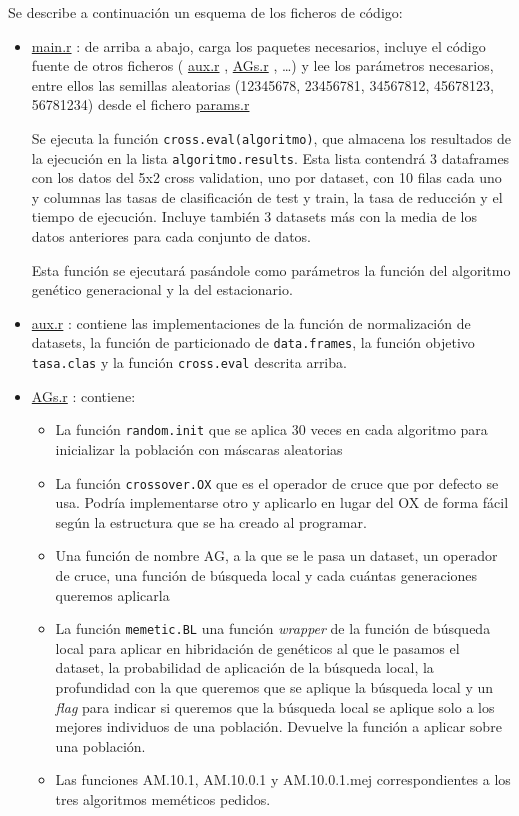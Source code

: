 \documentclass[a4paper,11pt]{article}
\newcommand{\hrefr}[1]{
\href{../bin/#1}{#1}
}
\begin{document}
Se describe a continuación un esquema de los ficheros de código:
\begin{itemize}
 \item \hrefr{main.r}: de arriba a abajo, carga los paquetes necesarios, incluye el código fuente de otros ficheros
  (\hrefr{aux.r}, \hrefr{AGs.r}, \ldots) y lee los parámetros necesarios, entre ellos las 
  semillas aleatorias (12345678, 23456781, 34567812, 45678123, 56781234) desde el fichero \hrefr{params.r}
  
  Se ejecuta la función \texttt{cross.eval(algoritmo)}, que almacena los resultados de la ejecución en la lista
  \texttt{algoritmo.results}. Esta lista contendrá 3 dataframes con los datos del 5x2 cross validation, uno por dataset, 
  con 10 filas cada uno  y columnas las tasas de clasificación de test y train, la tasa de reducción y el tiempo de 
  ejecución. Incluye también 3 datasets más con la media de los datos anteriores para cada conjunto de datos.
 
  Esta función se ejecutará pasándole como parámetros la función del algoritmo genético generacional y la del estacionario.
  
 \item \hrefr{aux.r}: contiene las implementaciones de la función de normalización de datasets, la función de
 particionado de \texttt{data.frames}, la función objetivo \texttt{tasa.clas} y la función \texttt{cross.eval}
 descrita arriba.
 
 \item \hrefr{AGs.r}: contiene:
  \begin{itemize}
   \item La función \texttt{random.init} que se aplica 30 veces en cada algoritmo para inicializar la
 población con máscaras aleatorias
   \item La función \texttt{crossover.OX} que es el operador de cruce que por defecto se usa. Podría implementarse otro y
   aplicarlo en lugar del OX de forma fácil según la estructura que se ha creado al programar.
   \item Una función de nombre AG, a la que se le pasa un dataset, un operador de cruce, una función de búsqueda local y
   cada cuántas generaciones queremos aplicarla
   \item La función \texttt{memetic.BL} una función \textit{wrapper} de la función de búsqueda local para aplicar en 
   hibridación de genéticos al que le pasamos el dataset, la probabilidad de aplicación de la búsqueda local, 
   la profundidad con la que queremos que se aplique la búsqueda local y un \textit{flag} para indicar si queremos que la
   búsqueda local se aplique solo a los mejores individuos de una población. Devuelve la función a aplicar sobre una población.
   \item Las funciones AM.10.1, AM.10.0.1 y AM.10.0.1.mej correspondientes a los tres algoritmos meméticos pedidos.
  \end{itemize}
  

\end{itemize}
\end{document}
